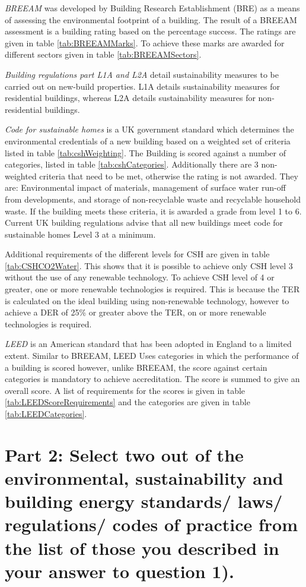 \documentclass[a4paper,fleqn]{article}
\let\stdsection\section
\renewcommand{\section}{\newpage\stdsection}
\begin{document}
\emph{BREEAM} was developed by Building Research Establishment (BRE) as a means of assessing the environmental 
footprint of a building. The result of a BREEAM assessment is a building rating based on the percentage success. 
The ratings are given in table \ref{tab:BREEAMMarks}. To achieve these marks are awarded for different sectors 
given in table \ref{tab:BREEAMSectors}.

\emph{Building regulations part L1A and L2A} detail sustainability measures to be carried out on new-build 
properties. L1A details sustainability measures for residential buildings, whereas L2A details sustainability 
measures for non-residential buildings.

\emph{Code for sustainable homes} is a UK government standard which determines the environmental 
credentials of a new building based on a weighted set of criteria listed in table \ref{tab:cshWeighting}. The 
Building is scored against a number of categories, listed in table \ref{tab:cshCategories}. Additionally there 
are 3 non-weighted criteria that need to be met, otherwise the rating is not awarded. They are: Environmental 
impact of materials, management of surface water run-off from developments, and storage of non-recyclable waste 
and recyclable household waste.
If the building meets these criteria, it is awarded a grade from level 1 to 6. Current UK building regulations 
advise that all new buildings meet code for sustainable homes Level 3 at a minimum. 

Additional requirements of the different levels for CSH are given in table \ref{tab:CSHCO2Water}. This shows that 
it is possible to achieve only CSH level 3 without the use of any renewable technology. To achieve CSH level of 
4 or greater, one or more renewable technologies is required. This is because the TER is calculated on the ideal 
building using non-renewable technology, however to achieve a DER of 25\% or greater above the TER, on or more 
renewable technologies is required.

\emph{LEED} is an American standard that has been adopted in England to a limited extent. Similar to BREEAM, 
LEED Uses categories in which the performance of a building is scored however, unlike BREEAM, the score against 
certain categories is mandatory to achieve accreditation. The score is summed to give an overall score. A list of 
requirements for the scores is given in table \ref{tab:LEEDScoreRequirements} and the categories are given in 
table \ref{tab:LEEDCategories}.

\pagebreak
\section*{Part 2: Select \textbf{two} out of the environmental, sustainability and building 
	energy standards/ laws/ regulations/ codes of practice from the list of those you described 
	in your answer to question 1).}
\end{document}

